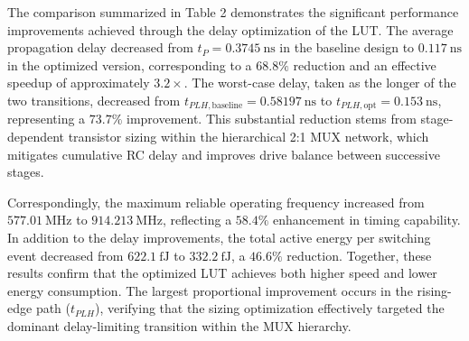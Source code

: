\documentclass[12pt]{article}
\begin{document}
\noindent
The comparison summarized in Table 2 demonstrates the significant performance improvements achieved through the delay optimization of the LUT. The average propagation delay decreased from $t_P = 0.3745~\text{ns}$ in the baseline design to $0.117~\text{ns}$ in the optimized version, corresponding to a $68.8\%$ reduction and an effective speedup of approximately $3.2\times$. The worst-case delay, taken as the longer of the two transitions, decreased from $t_{PLH,\text{baseline}} = 0.58197~\text{ns}$ to $t_{PLH,\text{opt}} = 0.153~\text{ns}$, representing a $73.7\%$ improvement. This substantial reduction stems from stage-dependent transistor sizing within the hierarchical 2:1 MUX network, which mitigates cumulative RC delay and improves drive balance between successive stages.

Correspondingly, the maximum reliable operating frequency increased from $577.01~\text{MHz}$ to $914.213~\text{MHz}$, reflecting a $58.4\%$ enhancement in timing capability. In addition to the delay improvements, the total active energy per switching event decreased from $622.1~\text{fJ}$ to $332.2~\text{fJ}$, a $46.6\%$ reduction. Together, these results confirm that the optimized LUT achieves both higher speed and lower energy consumption. The largest proportional improvement occurs in the rising-edge path ($t_{PLH}$), verifying that the sizing optimization effectively targeted the dominant delay-limiting transition within the MUX hierarchy.
\end{document}
